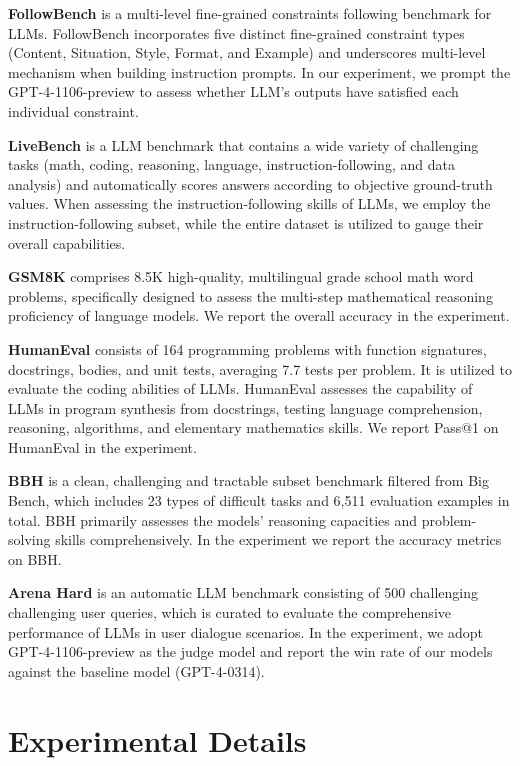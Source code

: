 \textbf{FollowBench} \citep{jiang2023followbench} is a multi-level fine-grained constraints following benchmark for LLMs.  FollowBench incorporates five distinct fine-grained constraint types (Content, Situation, Style, Format, and Example) and underscores multi-level mechanism when building instruction prompts. In our experiment, we prompt the GPT-4-1106-preview to assess whether LLM's outputs have satisfied each individual constraint.

\textbf{LiveBench} \citep{white2024livebench} is a LLM benchmark that contains a wide variety of challenging tasks (math, coding, reasoning, language, instruction-following, and data analysis) and automatically scores answers according to objective ground-truth values. When assessing the instruction-following skills of LLMs, we employ the instruction-following subset, while the entire dataset is utilized to gauge their overall capabilities.

\textbf{GSM8K} \citep{cobbe2021training} comprises 8.5K high-quality, multilingual grade school math word problems, specifically designed to assess the multi-step mathematical reasoning proficiency of language models. We report the overall accuracy in the experiment.

\textbf{HumanEval} \citep{chen2021evaluating} consists of 164 programming problems with function signatures, docstrings, bodies, and unit tests, averaging 7.7 tests per problem. It is utilized to evaluate the coding abilities of LLMs. HumanEval assesses the capability of LLMs in program synthesis from docstrings, testing language comprehension, reasoning, algorithms, and elementary mathematics skills. We report Pass@1 on HumanEval in the experiment.

\textbf{BBH} \citep{suzgun2022challenging} is a clean, challenging and tractable subset benchmark filtered from Big Bench, which includes 23 types of difficult tasks and 6,511 evaluation examples in total. BBH primarily assesses the models' reasoning capacities and problem-solving skills comprehensively. In the experiment we report the accuracy metrics on BBH.

\textbf{Arena Hard} \citep{li2024crowdsourced} is an automatic  LLM benchmark consisting of 500 challenging challenging user queries, which is curated to evaluate the comprehensive performance of LLMs in user dialogue scenarios. In the experiment, we adopt GPT-4-1106-preview as the judge model and report the win rate of our models against the baseline model (GPT-4-0314).


\section{Experimental Details}
